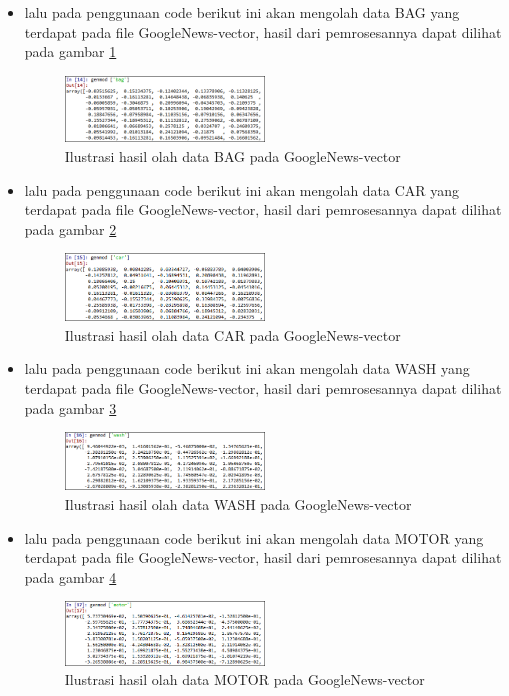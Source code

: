 \begin{enumerate}
\begin{itemize}
\item  lalu pada penggunaan code berikut ini akan mengolah data BAG yang terdapat pada file GoogleNews-vector, hasil dari pemrosesannya dapat dilihat pada gambar \ref{fig13}
\begin{figure}[!htbp]
	\centering
	\includegraphics[width=0.5\textwidth]{figures/fathi/chapter5/hari2/8}
	\caption{Ilustrasi hasil olah data BAG pada GoogleNews-vector}
	\label{fig13}
\end{figure}

\item  lalu pada penggunaan code berikut ini akan mengolah data CAR yang terdapat pada file GoogleNews-vector, hasil dari pemrosesannya dapat dilihat pada gambar \ref{fig14}
\begin{figure}[!htbp]
	\centering
	\includegraphics[width=0.5\textwidth]{figures/fathi/chapter5/hari2/9}
	\caption{Ilustrasi hasil olah data CAR pada GoogleNews-vector}
	\label{fig14}
\end{figure}

\item  lalu pada penggunaan code berikut ini akan mengolah data WASH yang terdapat pada file GoogleNews-vector, hasil dari pemrosesannya dapat dilihat pada gambar \ref{fig15}
\begin{figure}[!htbp]
	\centering
	\includegraphics[width=0.5\textwidth]{figures/fathi/chapter5/hari2/10}
	\caption{Ilustrasi hasil olah data WASH pada GoogleNews-vector}
	\label{fig15}
\end{figure}

\item  lalu pada penggunaan code berikut ini akan mengolah data MOTOR yang terdapat pada file GoogleNews-vector, hasil dari pemrosesannya dapat dilihat pada gambar \ref{fig16}
\begin{figure}[!htbp]
	\centering
	\includegraphics[width=0.5\textwidth]{figures/fathi/chapter5/hari2/11}
	\caption{Ilustrasi hasil olah data MOTOR pada GoogleNews-vector}
	\label{fig16}
\end{figure}


\end{itemize}
\end{enumerate}
